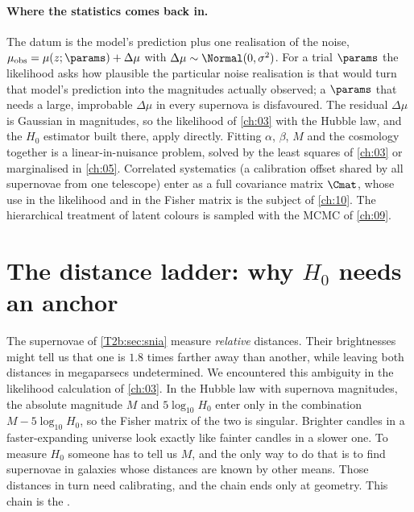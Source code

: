 \paragraph{Where the statistics comes back in.} The datum is the model's prediction plus one realisation of the noise, $\mu_{\rm obs}=\mu(z;\params)+\Delta\mu$ with $\Delta\mu\sim\Normal(0,\sigma^2)$. For a trial $\params$ the likelihood asks how plausible the particular noise realisation is that would turn that model's prediction into the magnitudes actually observed; a $\params$ that needs a large, improbable $\Delta\mu$ in every supernova is disfavoured. The residual $\Delta\mu$ is Gaussian in magnitudes, so the likelihood of \cref{ch:03} with the Hubble law, and the $H_0$ estimator built there, apply directly. Fitting $\alpha$, $\beta$, $M$ and the cosmology together is a linear-in-nuisance problem, solved by the least squares of \cref{ch:03} or marginalised in \cref{ch:05}. Correlated systematics (a calibration offset shared by all supernovae from one telescope) enter as a full covariance matrix $\Cmat$, whose use in the likelihood and in the Fisher matrix is the subject of \cref{ch:10}. The hierarchical treatment of latent colours is sampled with the MCMC of \cref{ch:09}.
\section{The distance ladder: why \texorpdfstring{$H_0$}{H0} needs an anchor}
\label{T2b:sec:ladder}

The supernovae of \cref{T2b:sec:snia} measure \emph{relative} distances. Their brightnesses might tell us that one is $1.8$ times farther away than another, while leaving both distances in megaparsecs undetermined. We encountered this ambiguity in the likelihood calculation of \cref{ch:03}. In the Hubble law with supernova magnitudes, the absolute magnitude $M$ and $5\log_{10}H_0$ enter only in the combination $M-5\log_{10}H_0$, so the Fisher matrix of the two is singular. Brighter candles in a faster-expanding universe look exactly like fainter candles in a slower one. To measure $H_0$ someone has to tell us $M$, and the only way to do that is to find supernovae in galaxies whose distances are known by other means. Those distances in turn need calibrating, and the chain ends only at geometry. This chain is the .

